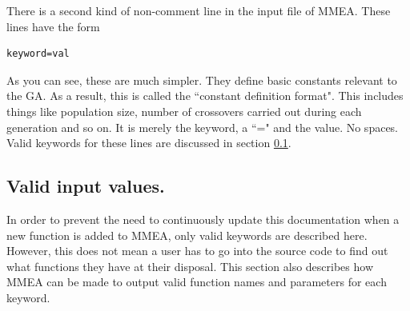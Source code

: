 \documentclass[12pt]{article}
\begin{document}
There is a second kind of non-comment line in the input file of MMEA. These lines have the form
\begin{verbatim}
keyword=val
\end{verbatim}
As you can see, these are much simpler. They define basic constants relevant to the GA. As a result, this is called the ``constant definition format". This includes things like population size, number of crossovers carried out during each generation and so on. It is merely the keyword, a ``=" and the value. No spaces. Valid keywords for these lines are discussed in section \ref{input_files_valid_parameters}.

\subsection{Valid input values.}
\label{input_files_valid_parameters}
In order to prevent the need to continuously update this documentation when a new function is added to MMEA, only valid keywords are described here. However, this does not mean a user has to go into the source code to find out what functions they have at their disposal. This section also describes how MMEA can be made to output valid function names and parameters for each keyword.
\end{document}
